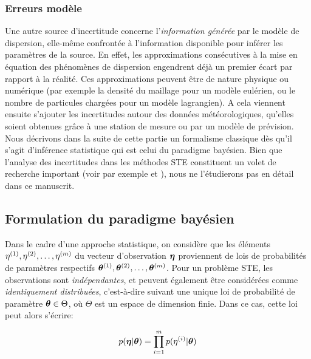 	\subsubsection{Erreurs modèle}
	Une autre source d'incertitude concerne l'\textit{information générée} par le modèle de dispersion, elle-même confrontée à l'information disponible pour inférer les paramètres de la source. En effet, les approximations consécutives à la mise en équation des phénomènes de dispersion engendrent déjà un premier écart par rapport à la réalité. Ces approximations peuvent être de nature physique ou numérique (par exemple la densité du maillage pour un modèle eulérien, ou le nombre de particules chargées pour un modèle lagrangien). A cela viennent ensuite s'ajouter les incertitudes autour des données météorologiques, qu'elles soient obtenues grâce à une station de mesure ou par un modèle de prévision. \\
	
	Nous décrivons dans la suite de cette partie un formalisme classique dès qu'il s'agit d'inférence statistique qui est celui du paradigme bayésien. Bien que l'analyse des incertitudes dans les méthodes STE constituent un volet de recherche important (voir par exemple \cite{Rodriguez2011} et \cite{Rodriguez2013}), nous ne l'étudierons pas en détail dans ce manuscrit. \\
	
	\subsection{Formulation du paradigme bayésien}
	\label{paragraphe_paradigme_bayesien}
	
	Dans le cadre d'une approche statistique, on considère que les éléments ${\eta}^{(1)}, {\eta}^{(2)}, \dots, {\eta}^{(m)}$ du vecteur d'observation ${\bm{\eta}}$ proviennent de lois de probabilités de paramètres respectifs ${\bm{\theta}}^{(1)}, {\bm{\theta}}^{(2)}, \dots, {\bm{\theta}}^{(m)}$. Pour un problème STE, les observations sont \textit{indépendantes}, et peuvent également être considérées comme \textit{identiquement distribuées}, c'est-à-dire suivant une unique loi de probabilité de paramètre ${\bm{\theta}} \in \Theta$, où $\Theta$ est un espace de dimension finie. Dans ce cas, cette loi peut alors s'écrire:
	
	\begin{equation}
		p({\bm{\eta}} | {\bm{\theta}}) = \prod_{i=1}^m p({\eta}^{(i)} | {\bm{\theta}})
		\label{eq_bayesien_modele_observation}
	\end{equation}
	
